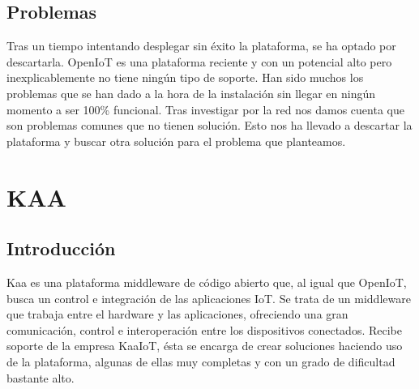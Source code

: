 \documentclass[12pt, twoside]{book}
\begin{document}
\section{Problemas}
Tras un tiempo intentando desplegar sin éxito la plataforma, se ha optado por descartarla. OpenIoT es una plataforma reciente y con un potencial alto pero inexplicablemente no tiene ningún tipo de soporte. Han sido muchos los problemas que se han dado a la hora de la instalación sin llegar en ningún momento a ser 100\% funcional. Tras investigar por la red nos damos cuenta que son problemas comunes que no tienen solución. Esto nos ha llevado a descartar la plataforma y buscar otra solución para el problema que planteamos.
\chapter{KAA}
\section{Introducción}
Kaa \cite{kaa}\cite{kaa_iot}\cite{code}\cite{doc} es una plataforma middleware de código abierto que, al igual que OpenIoT, busca un control e integración de las aplicaciones IoT. Se trata de un middleware que trabaja entre el hardware y las aplicaciones, ofreciendo una gran comunicación, control e interoperación entre los dispositivos conectados. Recibe soporte de la empresa KaaIoT\cite{kaa_iot}, ésta se encarga de crear soluciones haciendo uso de la plataforma, algunas de ellas muy completas y con un grado de dificultad bastante alto.
\end{document}
